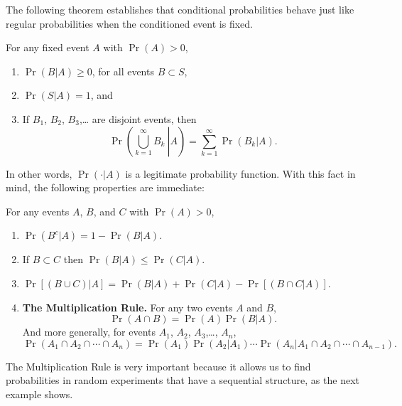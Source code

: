 \documentclass[captions=tableheading]{scrbook}
\begin{document}
The following theorem establishes that conditional probabilities behave just like regular probabilities when the conditioned event is fixed. 

\begin{thm}
For any fixed event \(A\) with \(\Pr(A)>0\),
\begin{enumerate}
\item \( \Pr (B|A)\geq 0 \), for all events \( B \subset S\),
\item \( \Pr (S|A) = 1 \), and
\item If \(B_{1}\), \(B_{2}\), \(B_{3}\),\ldots{} are disjoint events, then
  \begin{equation}
  \Pr\left(\left.\bigcup_{k=1}^{\infty}B_{k}\:\right|A\right)=\sum_{k=1}^{\infty}\Pr(B_{k}|A).
  \end{equation}
\end{enumerate}

\end{thm}
In other words, \(\Pr(\cdot|A)\) is a legitimate probability function. With this fact in mind, the following properties are immediate:

\begin{prop}
For any events \(A\), \(B\), and \(C\) with \(\Pr(A)>0\),
\begin{enumerate}
\item \( \Pr ( B^{c} | A ) = 1 - \Pr (B|A).\)
\item If \(B\subset C\) then \(\Pr(B|A)\leq\Pr(C|A)\).
\item \( \Pr [ ( B\cup C ) | A ] = \Pr (B|A) + \Pr(C|A) - \Pr [ (B \cap C|A) ].\)
\item \textbf{The Multiplication Rule.} For any two events \(A\) and \(B\),
  \begin{equation}
  \Pr(A\cap B)=\Pr(A)\Pr(B|A).\label{eq-multiplication-rule-short}
  \end{equation}
  And more generally, for events \(A_{1}\), \(A_{2}\), \(A_{3}\),\ldots{}, \(A_{n}\),
  \begin{equation}
  \Pr(A_{1}\cap A_{2}\cap\cdots\cap A_{n})=\Pr(A_{1})\Pr(A_{2}|A_{1})\cdots\Pr(A_{n}|A_{1}\cap A_{2}\cap\cdots\cap A_{n-1}).\label{eq-multiplication-rule-long}
  \end{equation}
\end{enumerate}

\end{prop}
The Multiplication Rule is very important because it allows us to find probabilities in random experiments that have a sequential structure, as the next example shows. 
\end{document}
